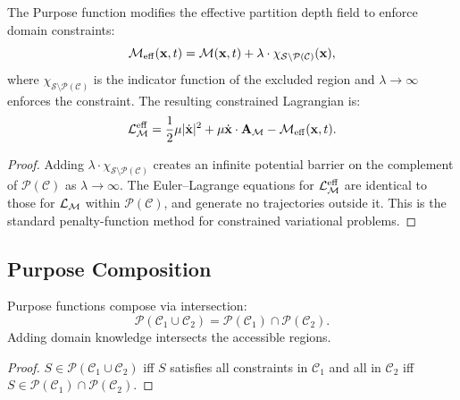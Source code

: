 \begin{theorem}
\label{thm:ch24-constrained}
The Purpose function modifies the effective partition depth field to enforce
domain constraints:
\begin{equation}
\label{eq:ch24-constrained-depth}
  \mathcal{M}_{\mathrm{eff}}(\mathbf{x}, t)
  = \mathcal{M}(\mathbf{x}, t)
  + \lambda \cdot \chi_{\mathcal{S} \setminus \mathcal{P}(\mathcal{C})}(\mathbf{x}),
\end{equation}
where $\chi_{\mathcal{S} \setminus \mathcal{P}(\mathcal{C})}$ is the indicator
function of the excluded region and $\lambda \to \infty$ enforces the
constraint.  The resulting constrained Lagrangian is:
\begin{equation}
\label{eq:ch24-constrained-lagrangian}
  \mathcal{L}_{\mathcal{M}}^{\mathrm{eff}}
  = \frac{1}{2}\mu|\dot{\mathbf{x}}|^2
  + \mu\dot{\mathbf{x}} \cdot \mathbf{A}_{\mathcal{M}}
  - \mathcal{M}_{\mathrm{eff}}(\mathbf{x}, t).
\end{equation}
\end{theorem}

\begin{proof}
Adding $\lambda \cdot \chi_{\mathcal{S} \setminus \mathcal{P}(\mathcal{C})}$
creates an infinite potential barrier on the complement of
$\mathcal{P}(\mathcal{C})$ as $\lambda \to \infty$.  The Euler--Lagrange
equations for $\mathcal{L}_{\mathcal{M}}^{\mathrm{eff}}$ are identical to those for
$\mathcal{L}_{\mathcal{M}}$ within $\mathcal{P}(\mathcal{C})$, and generate no trajectories
outside it.  This is the standard penalty-function method for constrained
variational problems.
\end{proof}

\subsection{Purpose Composition}
\label{sec:ch24-composition}

\begin{theorem}
\label{thm:ch24-composition}
Purpose functions compose via intersection:
\begin{equation}
\label{eq:ch24-composition}
  \mathcal{P}(\mathcal{C}_1 \cup \mathcal{C}_2)
  = \mathcal{P}(\mathcal{C}_1) \cap \mathcal{P}(\mathcal{C}_2).
\end{equation}
Adding domain knowledge intersects the accessible regions.
\end{theorem}

\begin{proof}
$S \in \mathcal{P}(\mathcal{C}_1 \cup \mathcal{C}_2)$ iff $S$ satisfies all
constraints in $\mathcal{C}_1$ and all in $\mathcal{C}_2$ iff
$S \in \mathcal{P}(\mathcal{C}_1) \cap \mathcal{P}(\mathcal{C}_2)$.
\end{proof}

